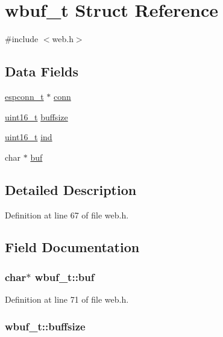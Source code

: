 \hypertarget{structwbuf__t}{\section{wbuf\-\_\-t Struct Reference}
\label{structwbuf__t}
}


{\ttfamily \#include $<$web.\-h$>$}

\subsection*{Data Fields}
\begin{DoxyCompactItemize}
\item 
\hyperlink{web_8h_a6dae30cd245bde804cf3e2c09e39a4b6}{espconn\-\_\-t} $\ast$ \hyperlink{structwbuf__t_a3ffa6bfa0cc399fc099d59f9e31839f4}{conn}
\item 
\hyperlink{send_8c_a273cf69d639a59973b6019625df33e30}{uint16\-\_\-t} \hyperlink{structwbuf__t_ad0589fcdc66cc162d2327faf60a59fe6}{buffsize}
\item 
\hyperlink{send_8c_a273cf69d639a59973b6019625df33e30}{uint16\-\_\-t} \hyperlink{structwbuf__t_aff9954e8b14b93e6898294df9046b70b}{ind}
\item 
char $\ast$ \hyperlink{structwbuf__t_a47331b135529434d81ab0afd37eedefc}{buf}
\end{DoxyCompactItemize}


\subsection{Detailed Description}


Definition at line 67 of file web.\-h.



\subsection{Field Documentation}
\hypertarget{structwbuf__t_a47331b135529434d81ab0afd37eedefc}{
\subsubsection[{buf}]{\setlength{\rightskip}{0pt plus 5cm}char$\ast$ wbuf\-\_\-t\-::buf}}\label{structwbuf__t_a47331b135529434d81ab0afd37eedefc}


Definition at line 71 of file web.\-h.

\hypertarget{structwbuf__t_ad0589fcdc66cc162d2327faf60a59fe6}{
\subsubsection[{buffsize}]{ wbuf\-\_\-t\-::buffsize}}\label{structwbuf__t_ad0589fcdc66cc162d2327faf60a59fe6}


